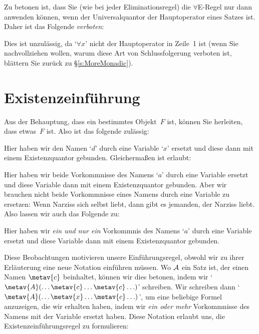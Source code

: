 Zu betonen ist, dass Sie (wie bei jeder Eliminationsregel) die $\forall$E-Regel nur dann anwenden können, wenn der Universalquantor der Hauptoperator eines Satzes ist. Daher ist das Folgende \emph{verboten}:
\begin{fitchproof}
\end{fitchproof}
Dies ist unzulässig, da `$\forall x$' nicht der Hauptoperator in Zeile~1 ist (wenn Sie nachvollziehen wollen, warum diese Art von Schlussfolgerung verboten ist, blättern Sie zurück zu \S\ref{s:MoreMonadic}).

\section{Existenzeinführung}
Aus der Behauptung, dass ein bestimmtes Objekt~$F$ ist, können Sie herleiten, dass etwas~$F$ ist. Also ist das folgende zulässig:
\begin{fitchproof}
	 
\end{fitchproof}
Hier haben wir den Namen `$d$' durch eine Variable `$x$' ersetzt und diese dann mit einem Existenzquantor gebunden. Gleicherma{\ss}en ist erlaubt:
\begin{fitchproof}
	 
\end{fitchproof}
Hier haben wir beide Vorkommnisse des Namens `$a$' durch eine Variable ersetzt und diese Variable dann mit einem Existenzquantor gebunden. Aber wir brauchen nicht beide Vorkommnisse eines Namens durch eine Variable zu ersetzen: Wenn Narziss sich selbst liebt, dann gibt es jemanden, der Narziss liebt. Also lassen wir auch das Folgende zu:
\begin{fitchproof}
	 
\end{fitchproof}
Hier haben wir \emph{ein und nur ein} Vorkommnis des Namens `$a$' durch eine Variable ersetzt und diese Variable dann mit einem Existenzquantor gebunden. 

Diese Beobachtungen motivieren unsere Einführungsregel, obwohl wir zu ihrer Erläuterung eine neue Notation einführen müssen. Wo $\mathcal{A}$ ein Satz ist, der einen Namen $\metav{c}$ beinhaltet, können wir dies betonen, indem wir `$\metav{A}(\ldots \metav{c} \ldots \metav{c}\ldots)$' schreiben. Wir schreiben dann `$\metav{A}(\ldots \metav{x} \ldots \metav{c}\ldots)$', um eine beliebige Formel anzuzeigen, die wir erhalten haben, indem wir \emph{ein oder mehr} Vorkommnisse des Namens  mit der Variable  ersetzt haben. Diese Notation erlaubt uns, die Existenzeinführungsregel zu formulieren:

